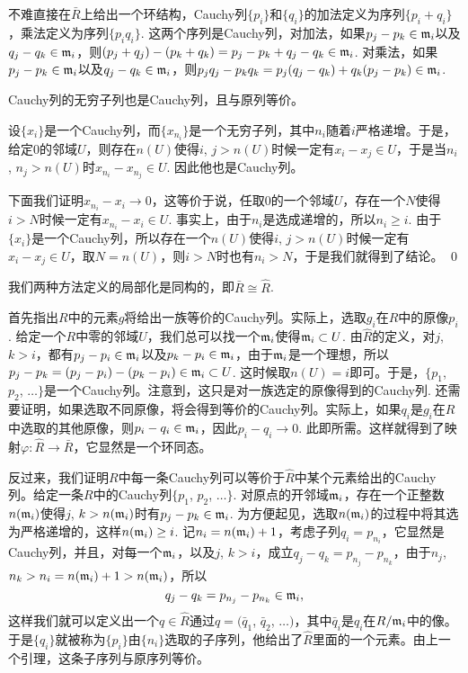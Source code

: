 不难直接在$\bar{R}$上给出一个环结构，Cauchy列$\{p_i\}$和$\{q_i\}$的加法定义为序列$\{p_i+q_i\}$，乘法定义为序列$\{p_iq_i\}$. 这两个序列是Cauchy列，对加法，如果$p_j-p_k\in \mathfrak{m}_i$以及$q_j-q_k\in \mathfrak{m}_i$，则$(p_j+q_j)-(p_k+q_k)=p_j-p_k+q_j-q_k \in \mathfrak{m}_i$. 对乘法，如果$p_j-p_k\in \mathfrak{m}_i$以及$q_j-q_k\in \mathfrak{m}_i$，则$p_jq_j-p_kq_k=p_j(q_j-q_k)+q_k(p_j-p_k)\in \mathfrak{m}_i$. 

\lem Cauchy列的无穷子列也是Cauchy列，且与原列等价。

\proof
	设$\{x_i\}$是一个Cauchy列，而$\{x_{n_i}\}$是一个无穷子列，其中$n_i$随着$i$严格递增。于是，给定$0$的邻域$U$，则存在$n(U)$使得$i$, $j>n(U)$时候一定有$x_i-x_j\in U$，于是当$n_i$, $n_j>n(U)$时$x_{n_i}-x_{n_j}\in U$. 因此他也是Cauchy列。

	下面我们证明$x_{n_i}-x_i\to 0$，这等价于说，任取$0$的一个邻域$U$，存在一个$N$使得$i>N$时候一定有$x_{n_i}-x_{i}\in U$. 事实上，由于$n_i$是选成递增的，所以$n_i\geq i$. 由于$\{x_i\}$是一个Cauchy列，所以存在一个$n(U)$使得$i$, $j>n(U)$时候一定有$x_i-x_j\in U$，取$N=n(U)$，则$i>N$时也有$n_i>N$，于是我们就得到了结论。
\qed

\pro 我们两种方法定义的局部化是同构的，即$\bar{R}\cong \hat R$.

\proof
	首先指出$R$中的元素$g$将给出一族等价的Cauchy列。实际上，选取$g_i$在$R$中的原像$p_i$. 给定一个$R$中零的邻域$U$，我们总可以找一个$\mathfrak{m}_i$使得$\mathfrak{m}_i\subset U$. 由$\hat R$的定义，对$j$, $k>i$，都有$p_j-p_i\in \mathfrak{m}_i$以及$p_k-p_i \in \mathfrak{m}_i$，由于$\mathfrak{m}_i$是一个理想，所以$p_j-p_k=(p_j-p_i)-(p_k-p_i)\in \mathfrak{m}_i\subset U$. 这时候取$n(U)=i$即可。于是，$\{p_1$, $p_2$, $\dots\}$是一个Cauchy列。注意到，这只是对一族选定的原像得到的Cauchy列. 还需要证明，如果选取不同原像，将会得到等价的Cauchy列。实际上，如果$q_i$是$g_i$在$R$中选取的其他原像，则$p_i-q_i\in \mathfrak{m}_i$，因此$p_i-q_i\to 0$. 此即所需。这样就得到了映射$\varphi:\hat{R}\to \bar{R}$，它显然是一个环同态。

	反过来，我们证明$R$中每一条Cauchy列可以等价于$\hat R$中某个元素给出的Cauchy列。给定一条$R$中的Cauchy列$\{p_1$, $p_2$, $\dots\}$. 对原点的开邻域$\mathfrak{m}_i$，存在一个正整数$n(\mathfrak{m}_i)$使得$j$, $k>n(\mathfrak{m}_i)$时有$p_j-p_k\in \mathfrak{m}_i$. 为方便起见，选取$n(\mathfrak{m}_i)$的过程中将其选为严格递增的，这样$n(\mathfrak{m}_i)\geq i$. 记$n_i=n(\mathfrak{m}_i)+1$，考虑子列$q_i=p_{n_i}$，它显然是Cauchy列，并且，对每一个$\mathfrak{m}_i$，以及$j$, $k>i$，成立$q_j-q_k=p_{n_j}-p_{n_k}$，由于$n_j$, $n_k>n_i=n(\mathfrak{m}_i)+1>n(\mathfrak{m}_i)$，所以
	\[
		q_j-q_k=p_{n_j}-p_{n_k}\in \mathfrak{m}_i,
	\]
	这样我们就可以定义出一个$q\in \hat R$通过$q=(\bar{q}_1$, $\bar{q}_2$, $\dots)$，其中$\bar{q}_i$是$q_i$在$R/\mathfrak{m}_i$中的像。于是$\{q_i\}$就被称为$\{p_i\}$由$\{n_i\}$选取的子序列，他给出了$\hat R$里面的一个元素。由上一个引理，这条子序列与原序列等价。

